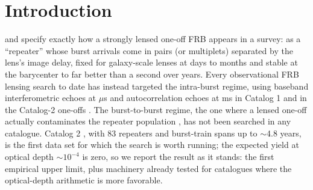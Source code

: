 \documentclass[twocolumn]{aastex631}
\begin{document}
\section{Introduction}
\citet{dailu2017} and \citet{li2018} specify exactly how a strongly lensed one-off FRB appears
in a survey: as a ``repeater'' whose burst arrivals come in pairs (or multiplets) separated
by the lens's image delay, fixed for galaxy-scale lenses at days to months and stable at the
barycenter to far better than a second over years. Every observational FRB lensing search to
date has instead targeted the intra-burst regime, using baseband interferometric echoes at
$\mu$s \citep{leung2022,kader2022} and autocorrelation echoes at ms in Catalog 1
\citep{cat1lens} and in the Catalog-2 one-offs \citep{microlens2026}. The burst-to-burst
regime, the one where a lensed one-off actually contaminates the repeater population
\citep{cook2026}, has not been searched in any catalogue. Catalog 2 \citep{cat2}, with 83
repeaters and burst-train spans up to $\sim$4.8 years, is the first data set for which the
search is worth running; the expected yield at optical depth $\sim$$10^{-4}$ is zero, so we
report the result as it stands: the first empirical upper limit, plus machinery already
tested for catalogues where the optical-depth arithmetic is more favorable.
\end{document}
